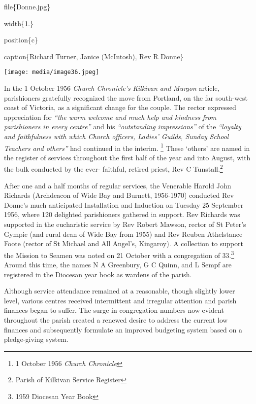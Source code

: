 file\{Donne.jpg\}

width\{1.\}

position\{c\}

caption\{Richard Turner, Janice (McIntosh), Rev R Donne\}

\texttt{[image: media/image36.jpeg]}

In the 1 October 1956 \emph{Church Chronicle's Kilkivan and Murgon} article, parishioners gratefully recognized the move from Portland, on the far south-west coast of Victoria, as a significant change for the couple. The rector expressed appreciation for \emph{``the warm welcome and much help and kindness from parishioners in every centre''} and his \emph{``outstanding impressions''} of the \emph{``loyalty and faithfulness with which Church officers, Ladies' Guilds, Sunday School Teachers and others''} had continued in the interim. \footnote{1 October 1956 \emph{Church Chronicle}} These `others' are named in the register of services throughout the first half of the year and into August, with the bulk conducted by the ever- faithful, retired priest, Rev C Tunstall.\footnote{Parish of Kilkivan Service Register}

After one and a half months of regular services, the Venerable Harold John Richards (Archdeacon of Wide Bay and Burnett, 1956-1970) conducted Rev Donne's much anticipated Installation and Induction on Tuesday 25 September 1956, where 120 delighted parishioners gathered in support. Rev Richards was supported in the eucharistic service by Rev Robert Mawson, rector of St Peter's Gympie (and rural dean of Wide Bay from 1955) and Rev Reuben Athelstance Foote (rector of St Michael and All Angel's, Kingaroy). A collection to support the Mission to Seamen was noted on 21 October with a congregation of 33.\footnote{1959 Diocesan Year Book} Around this time, the names N A Greenbury, G C Quinn, and L Sempf are registered in the Diocesan year book as wardens of the parish.

Although service attendance remained at a reasonable, though slightly lower level, various centres received intermittent and irregular attention and parish finances began to suffer. The surge in congregation numbers now evident throughout the parish created a renewed desire to address the current low finances and subsequently formulate an improved budgeting system based on a pledge-giving system.

